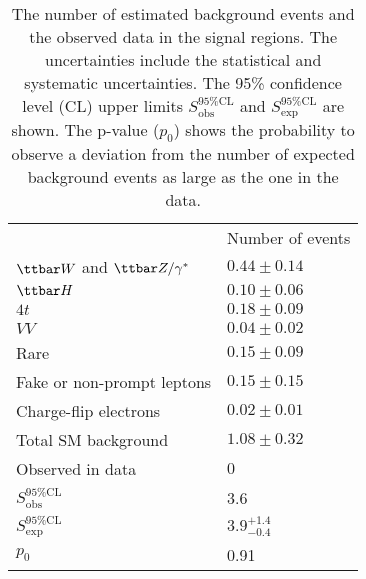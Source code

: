 \begin{table}[htb]
    \begin{center}
        {\scriptsize
            \begin{tabular}{ll}
                \hline
                \hline
                                                     & Number of events\\
                $\ttbar W$ and $\ttbar Z/\gamma^{*}$ & $0.44 \pm 0.14$\\
                $\ttbar H$                           & $0.10 \pm 0.06$\\
                $4t$                                 & $0.18 \pm 0.09$\\
                $VV$                                 & $0.04 \pm 0.02$\\
                Rare                                 & $0.15 \pm 0.09$\\
                Fake or non-prompt leptons           & $0.15 \pm 0.15$\\
                Charge-flip electrons                & $0.02 \pm 0.01$\\
                Total SM background                  & $1.08 \pm 0.32$\\
                \hline
                Observed in data                     & $0$\\
                \hline
                $S_\mathrm{obs}^\mathrm{95\%CL}$     & 3.6\\
                $S_\mathrm{exp}^\mathrm{95\%CL}$     & $3.9^{+1.4}_{-0.4}$\\
                $p_{0}$                              & 0.91\\
                \hline
                \hline
            \end{tabular}
        }
    \end{center}
    \caption{The number of estimated background events and the observed data in the signal regions.
    The uncertainties include the statistical and systematic uncertainties.
    The 95\% confidence level (CL) upper limits $S_\mathrm{obs}^\mathrm{95\%CL}$ and $S_\mathrm{exp}^\mathrm{95\%CL}$ are shown.
    The p-value ($p_{0}$) shows the probability to observe a deviation from the number of expected background events as large as the one in the data.}
    \label{tab:app_ss3l_SR_yields}
\end{table}%

